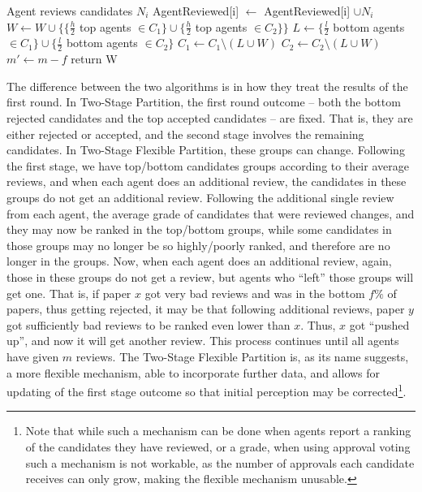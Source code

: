 \documentclass[letterpaper]{article} %
\newcommand{\omer}[1]{\textcolor{red}{\textbf{Omer Says:} #1 }}
\newcommand{\oshri}[1]{\textcolor{blue}{\textbf{Oshri Says:} #1 }}
\begin{document}
\begin{algorithm}[t]
\begin{algorithmic}[1]
 \State Agent reviews candidates $N_{i}$ %
 \State AgentReviewed[i] $\gets$ AgentReviewed[i] $\cup N_{i}$
 \EndFor
 \State $W \gets W \cup \{ \{ \frac{h}{2}$ top agents $\in C_{1} \} \cup \{ \frac{h}{2}$ top agents $\in C_{2} \} \}$
 \State $L \gets \{ \frac{l}{2}$ bottom agents $\in C_{1} \} \cup \{ \frac{l}{2}$ bottom agents $\in C_{2} \}$
 \State $C_{1}\gets C_{1}\setminus (L\cup W)$
 \State $C_{2}\gets C_{2}\setminus (L\cup W)$
 \State $m' \gets m-f$
\EndFor
\State return W
\end{algorithmic}
\end{algorithm}
\normalsize

The difference between the two algorithms is in how they treat the results of the first round. In Two-Stage Partition, the first round outcome -- both the bottom rejected candidates and the top accepted candidates -- are fixed. That is, they are either rejected or accepted, and the second stage involves the remaining candidates. In Two-Stage Flexible Partition, these groups can change. Following the first stage, we have top/bottom candidates groups according to their average reviews, and when each agent does an additional review, the candidates in these groups do not get an additional review. Following the additional single review from each agent, the average grade of candidates that were reviewed changes, and they may now be ranked in the top/bottom groups, while some candidates in those groups may no longer be so highly/poorly ranked, and therefore are no longer in the groups. Now, when each agent does an additional review, again, those in these groups do not get a review, but agents who ``left'' those groups will get one. That is, if paper $x$ got very bad reviews and was in the bottom $f\%$ of papers, thus getting rejected, it may be that following additional reviews, paper $y$ got sufficiently bad reviews to be ranked even lower than $x$. Thus, $x$ got ``pushed up'', and now it will get another review. This process continues until all agents have given $m$ reviews. 
The Two-Stage Flexible Partition is, as its name suggests, a more flexible mechanism, able to incorporate further data, and allows for updating of the first stage outcome so that initial perception may be corrected\footnote{Note that while such a mechanism can be done when agents report a ranking of the candidates they have reviewed, or a grade, when using approval voting such a mechanism is not workable, as the number of approvals each candidate receives can only grow, making the flexible mechanism unusable.}.
\end{document}
